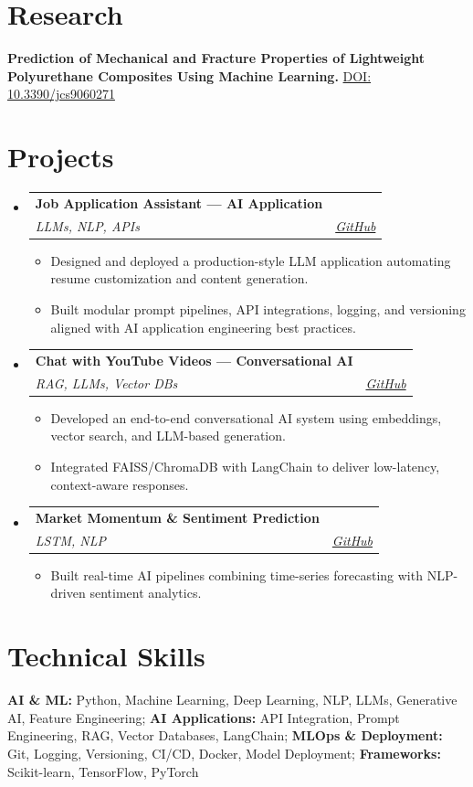 \documentclass[letterpaper,11pt]{article}
\makeatletter
\newcommand{\resumeItem}[1]{\item\small{#1}}
\newcommand{\resumeSubheading}[4]{
\item
\begin{tabular*}{0.97\textwidth}{l@{\extracolsep{\fill}}r}
\textbf{#1} & #2 \\
\textit{\small #3} & \textit{\small #4}
\end{tabular*}
}
\newcommand{\resumeItemListStart}{
\begin{itemize}[leftmargin=0.15in,itemsep=1pt,topsep=2pt]
}
\newcommand{\resumeItemListEnd}{\end{itemize}}
\makeatother
\begin{document}
\section{Research}
\small{
\textbf{Prediction of Mechanical and Fracture Properties of Lightweight Polyurethane Composites Using Machine Learning.}
\href{https://doi.org/10.3390/jcs9060271}{DOI: 10.3390/jcs9060271}
}

\section{Projects}
\begin{itemize}[leftmargin=0.15in,label={}]
\resumeSubheading
{Job Application Assistant — AI Application}{}
{LLMs, NLP, APIs}{\href{https://github.com/nikhileshnarkhede/job-application-assistant}{GitHub}}
\resumeItemListStart
\resumeItem{Designed and deployed a production-style LLM application automating resume customization and content generation.}
\resumeItem{Built modular prompt pipelines, API integrations, logging, and versioning aligned with AI application engineering best practices.}
\resumeItemListEnd
\resumeSubheading
{Chat with YouTube Videos — Conversational AI}{}
{RAG, LLMs, Vector DBs}{\href{https://github.com/nikhileshnarkhede/Chat_with_YouTube_Video}{GitHub}}
\resumeItemListStart
\resumeItem{Developed an end-to-end conversational AI system using embeddings, vector search, and LLM-based generation.}
\resumeItem{Integrated FAISS/ChromaDB with LangChain to deliver low-latency, context-aware responses.}
\resumeItemListEnd
\resumeSubheading
{Market Momentum \& Sentiment Prediction}{}
{LSTM, NLP}{\href{https://github.com/nikhileshnarkhede/Real-Time-Evolving-Deep-Learning-Model-for-S-P-500-Momentum-and-Sentiment-Prediction}{GitHub}}
\resumeItemListStart
\resumeItem{Built real-time AI pipelines combining time-series forecasting with NLP-driven sentiment analytics.}
\resumeItemListEnd
\end{itemize}

\section{Technical Skills}
\small{
\textbf{AI \& ML:} Python, Machine Learning, Deep Learning, NLP, LLMs, Generative AI, Feature Engineering; 
\textbf{AI Applications:} API Integration, Prompt Engineering, RAG, Vector Databases, LangChain; 
\textbf{MLOps \& Deployment:} Git, Logging, Versioning, CI/CD, Docker, Model Deployment; 
\textbf{Frameworks:} Scikit-learn, TensorFlow, PyTorch
}
\end{document}

